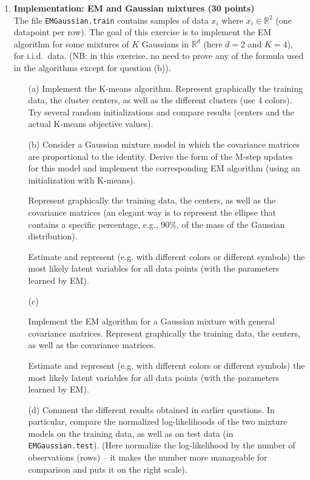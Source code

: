 \documentclass[12pt]{article}
\newcommand{\BNUM}{\begin{enumerate}}
\newcommand{\ENUM}{\end{enumerate}}
\newcommand{\1}{{\bf 1}}
\newcommand{\rb}{\mathbb{R}}
\begin{document}
\begin{enumerate}
\vspace{0.2cm}

\item {\bf Implementation: EM and Gaussian mixtures (30 points)} \\
The file \texttt{EMGaussian.train} contains samples of data  $x_i$ where $x_i \in \rb^2$ (one datapoint per row). The goal of this exercise is to implement the EM algorithm for some mixtures of $K$ Gaussians in $\rb^d$ (here $d=2$ and $K=4$), for i.i.d.~data.
(NB: in this exercise, no need to prove any of the formula used in the algorithms except for question (b)).

\BNUM
\item[(a)]
Implement the K-means algorithm. Represent graphically the training data, the cluster centers, as well as the different clusters (use 4 colors). Try several random initializations and compare results (centers and the actual K-means objective values).

\item[(b)]
Consider a Gaussian mixture model in which the covariance matrices are proportional to the identity.
Derive the form of the M-step updates for this model and implement the corresponding EM algorithm (using an initialization with K-means).

Represent graphically the training data, the centers, as well as the covariance matrices (an elegant way is to represent the ellipse that contains a specific percentage, e.g., 90\%, of the mass of the Gaussian distribution).

Estimate and represent (e.g. with different colors or different symbols) the most likely latent variables for all data points (with the parameters learned by EM).

\item[(c)]

Implement the EM algorithm for a Gaussian mixture with general covariance matrices. 
Represent graphically the training data, the centers, as well as the covariance matrices.

Estimate and represent (e.g. with different colors or different symbols) the most likely latent variables for all data points (with the parameters learned by EM).
 

\item[(d)] Comment the different results obtained in earlier questions. In particular, compare the normalized log-likelihoods of the two mixture models on the training data, as well as on test data (in \texttt{EMGaussian.test}). (Here normalize the log-likelihood by the number of observations (rows) -- it makes the number more manageable for comparison and puts it on the right scale).


\ENUM

\end{enumerate}
\end{document}
